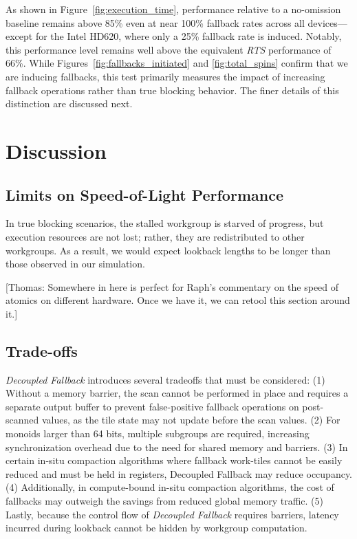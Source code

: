\documentclass[sigconf]{acmart}
\newcommand{\thomas}[1]{{\footnotesize\color{orange}[Thomas: #1]}}
\begin{document}
As shown in Figure~\ref{fig:execution_time}, performance relative to a no-omission baseline remains above 85\% even at near 100\% fallback rates across all devices---except for the Intel HD620, where only a 25\% fallback rate is induced. Notably, this performance level remains well above the equivalent \emph{RTS} performance of 66\%. While Figures~\ref{fig:fallbacks_initiated} and \ref{fig:total_spins} confirm that we are inducing fallbacks, this test primarily measures the impact of increasing fallback operations rather than true blocking behavior. The finer details of this distinction are discussed next.
\section{Discussion}
\subsection{Limits on Speed-of-Light Performance}

In true blocking scenarios, the stalled workgroup is starved of progress, but execution resources are not lost; rather, they are redistributed to other workgroups. As a result, we would expect lookback lengths to be longer than those observed in our simulation.

\thomas{Somewhere in here is perfect for Raph's commentary on the speed of atomics on different hardware. Once we have it, we can retool this section around it.}

\subsection{Trade-offs}
\emph{Decoupled Fallback} introduces several tradeoffs that must be considered: (1) Without a memory barrier, the scan cannot be performed in place and requires a separate output buffer to prevent false-positive fallback operations on post-scanned values, as the tile state may not update before the scan values. (2) For monoids larger than 64 bits, multiple subgroups are required, increasing synchronization overhead due to the need for shared memory and barriers. (3) In certain in-situ compaction algorithms where fallback work-tiles cannot be easily reduced and must be held in registers, Decoupled Fallback may reduce occupancy. (4) Additionally, in compute-bound in-situ compaction algorithms, the cost of fallbacks may outweigh the savings from reduced global memory traffic. (5) Lastly, because the control flow of \emph{Decoupled Fallback} requires barriers, latency incurred during lookback cannot be hidden by workgroup computation.
\end{document}
